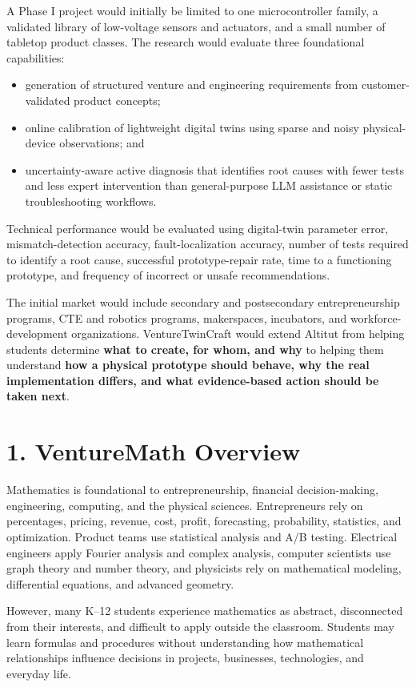 A Phase I project would initially be limited to one microcontroller family, a validated library of low-voltage sensors and actuators, and a small number of tabletop product classes. The research would evaluate three foundational capabilities:
\begin{itemize}
    \item generation of structured venture and engineering requirements from customer-validated product concepts;
    \item online calibration of lightweight digital twins using sparse and noisy physical-device observations; and
    \item uncertainty-aware active diagnosis that identifies root causes with fewer tests and less expert intervention than general-purpose LLM assistance or static troubleshooting workflows.
\end{itemize}

Technical performance would be evaluated using digital-twin parameter error, mismatch-detection accuracy, fault-localization accuracy, number of tests required to identify a root cause, successful prototype-repair rate, time to a functioning prototype, and frequency of incorrect or unsafe recommendations.

The initial market would include secondary and postsecondary entrepreneurship programs, CTE and robotics programs, makerspaces, incubators, and workforce-development organizations. VentureTwinCraft would extend Altitut from helping students determine \textbf{what to create, for whom, and why} to helping them understand \textbf{how a physical prototype should behave, why the real implementation differs, and what evidence-based action should be taken next}.


\newpage

\section{1. VentureMath Overview}
Mathematics is foundational to entrepreneurship, financial decision-making, engineering, computing, and the physical sciences. Entrepreneurs rely on percentages, pricing, revenue, cost, profit, forecasting, probability, statistics, and optimization. Product teams use statistical analysis and A/B testing. Electrical engineers apply Fourier analysis and complex analysis, computer scientists use graph theory and number theory, and physicists rely on mathematical modeling, differential equations, and advanced geometry.

However, many K–12 students experience mathematics as abstract, disconnected from their interests, and difficult to apply outside the classroom. Students may learn formulas and procedures without understanding how mathematical relationships influence decisions in projects, businesses, technologies, and everyday life.


